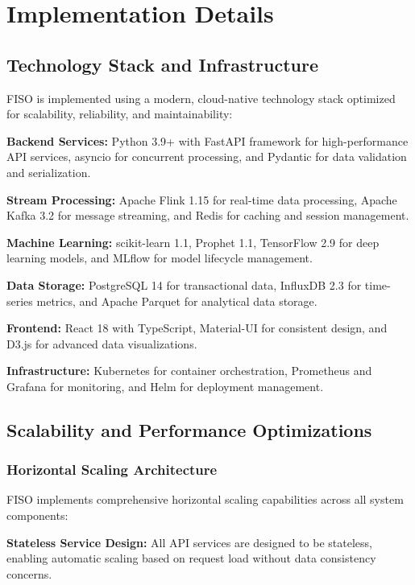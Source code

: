 \documentclass[conference]{IEEEtran}
\begin{document}
\section{Implementation Details}

\subsection{Technology Stack and Infrastructure}

FISO is implemented using a modern, cloud-native technology stack optimized for scalability, reliability, and maintainability:

\textbf{Backend Services:} Python 3.9+ with FastAPI framework for high-performance API services, asyncio for concurrent processing, and Pydantic for data validation and serialization.

\textbf{Stream Processing:} Apache Flink 1.15 for real-time data processing, Apache Kafka 3.2 for message streaming, and Redis for caching and session management.

\textbf{Machine Learning:} scikit-learn 1.1, Prophet 1.1, TensorFlow 2.9 for deep learning models, and MLflow for model lifecycle management.

\textbf{Data Storage:} PostgreSQL 14 for transactional data, InfluxDB 2.3 for time-series metrics, and Apache Parquet for analytical data storage.

\textbf{Frontend:} React 18 with TypeScript, Material-UI for consistent design, and D3.js for advanced data visualizations.

\textbf{Infrastructure:} Kubernetes for container orchestration, Prometheus and Grafana for monitoring, and Helm for deployment management.

\subsection{Scalability and Performance Optimizations}

\subsubsection{Horizontal Scaling Architecture}

FISO implements comprehensive horizontal scaling capabilities across all system components:

\textbf{Stateless Service Design:} All API services are designed to be stateless, enabling automatic scaling based on request load without data consistency concerns.
\end{document}
